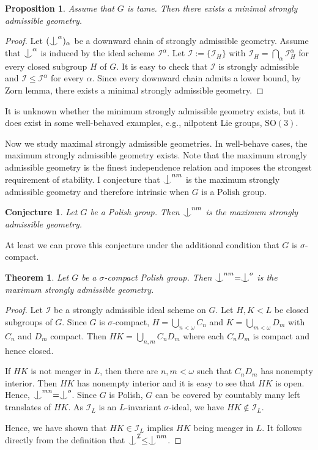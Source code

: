 \documentclass{article}
\newtheorem{theorem}[definition]{Theorem}
\newtheorem{prop}[definition]{Proposition}
\newtheorem{conj}[definition]{Conjecture}
\newcommand{\I}{\mathcal{I}}
\newcommand{\SO}{\mathrm{SO}}
\newcommand{\ind}{\mathrel{\raise0.2ex\hbox{\ooalign{\hidewidth$\vert$\hidewidth\cr\raise-0.9ex\hbox{$\smile$}}}}}
\begin{document}
\begin{prop}
Assume that $G$ is tame.
Then there exists a minimal strongly admissible geometry. 
\end{prop}
\begin{proof}
Let $(\ind^\alpha)_\alpha$ be a downward chain of strongly admissible geometry. Assume that $\ind^\alpha$ is induced by the ideal scheme $\I^\alpha$. Let $\I:=\{\I_H\}$ with $\I_H=\bigcap_\alpha \I_H^\alpha$ for every closed subgroup $H$ of $G$. It is easy to check that $\I$ is strongly admissible and $\I\leq \I^\alpha$ for every $\alpha$. Since every downward chain admits a lower bound, by Zorn lemma, there exists a minimal strongly admissible geometry. 
\end{proof}

It is unknown whether the minimum strongly admissible geometry exists, but it does exist in some well-behaved examples, e.g., nilpotent Lie groups, $\SO(3)$. 

Now we study maximal strongly admissible geometries. In well-behave cases, the maximum strongly admissible geometry exists.
Note that the maximum strongly admissible geometry is the finest independence relation and imposes the strongest requirement of stability. I conjecture that $\ind^{nm}$ is the maximum strongly admissible geometry and therefore intrinsic when $G$ is a Polish group.

\begin{conj}
Let $G$ be a Polish group. Then $\ind^{nm}$ is the maximum strongly admissible geometry. 
\end{conj}

At least we can prove this conjecture under the additional condition that $G$ is $\sigma$-compact.


\begin{theorem}\label{thm-nm-max}
Let $G$ be a $\sigma$-compact Polish group. Then $\ind^{nm}=\ind^o$ is the maximum strongly admissible geometry. 
\end{theorem}
\begin{proof}
Let $\I$ be a strongly admissible ideal scheme on $G$. Let $H,K<L$ be closed subgroups of $G$. Since $G$ is $\sigma$-compact, $H=\bigcup_{n<\omega} C_n$ and $K=\bigcup_{m<\omega}D_m$ with $C_n$ and $D_m$ compact. Then $HK=\bigcup_{n,m} C_n D_m$ where each $C_nD_m$ is compact and hence closed. 

If $HK$ is not meager in $L$, then there are $n,m<\omega$ such that $C_nD_m$ has nonempty interior. Then $HK$ has nonempty interior and it is easy to see that $HK$ is open. Hence, $\ind^{mn}=\ind^o$. Since $G$ is Polish, $G$ can be covered by countably many left translates of $HK$. As $\I_L$ is an $L$-invariant $\sigma$-ideal, we have $HK\notin \I_L$. 

Hence, we have shown that $HK\in\I_L$ implies $HK$ being meager in $L$. It follows directly from the definition that $\ind^\I\leq \ind^{nm}$.
\end{proof}
\end{document}
